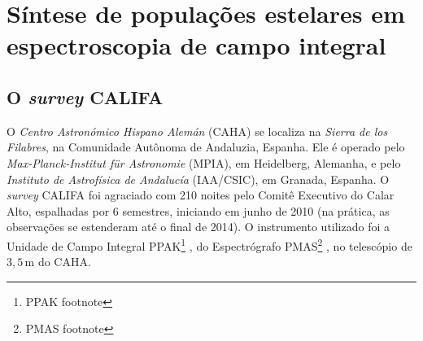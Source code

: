 


\chapter{Síntese de populações estelares em espectroscopia de campo integral}
\label{sec:ifs}


\section{O {\em survey} CALIFA}

O {\em Centro Astronómico Hispano Alemán} (CAHA) se localiza na {\em Sierra de
los Filabres}, na Comunidade Autônoma de Andaluzia, Espanha. Ele é operado pelo
{\em Max-Planck-Institut für Astronomie} (MPIA), em Heidelberg, Alemanha, e pelo
{\em Instituto de Astrofísica de Andalucía} (IAA/CSIC), em Granada, Espanha. O
{\em survey} CALIFA foi agraciado com 210 noites pelo Comitê Executivo do Calar
Alto, espalhadas por 6 semestres, iniciando em junho de 2010 (na prática, as
observações se estenderam até o final de 2014). O instrumento utilizado foi a
Unidade de Campo Integral PPAK\footnote{\TODO PPAK footnote}
\citep{Kelz2006}, do Espectrógrafo PMAS\footnote{\TODO PMAS footnote}
\citep{Roth2005, Roth2010}, no telescópio de $3,5\,\mathrm{m}$ do CAHA.

